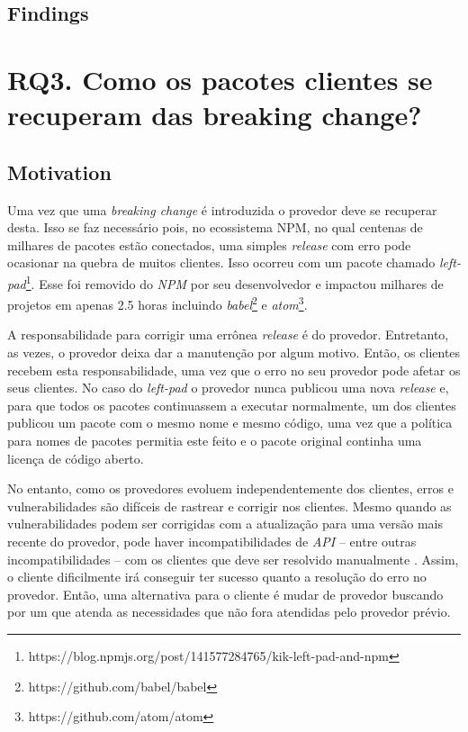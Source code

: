 \subsection{Findings}
\label{fin:rq2}

\section{RQ3. Como os pacotes clientes se recuperam das breaking change?}
\label{sec:rq3}

\subsection{Motivation}
\label{mot:rq3}

Uma vez que uma \textit{breaking change} é introduzida o provedor deve se recuperar desta. Isso se faz necessário pois, no ecossistema \gls{NPM}, no qual centenas de milhares de pacotes estão conectados, uma simples \textit{release} com erro pode ocasionar na quebra de muitos clientes. Isso ocorreu com um pacote chamado \textit{left-pad}\footnote{https://blog.npmjs.org/post/141577284765/kik-left-pad-and-npm}. Esse foi removido do \textit{NPM} por seu desenvolvedor e impactou milhares de projetos em apenas 2.5 horas incluindo \textit{babel}\footnote{https://github.com/babel/babel} e \textit{atom}\footnote{https://github.com/atom/atom}.

A responsabilidade para corrigir uma errônea \textit{release} é do provedor. Entretanto, as vezes, o provedor deixa dar a manutenção por algum motivo. Então, os clientes recebem esta responsabilidade, uma vez que o erro no seu provedor pode afetar os seus clientes. No caso do \textit{left-pad} o provedor nunca publicou uma nova \textit{release} e, para que todos os pacotes continuassem a executar normalmente, um dos clientes publicou um pacote com o mesmo nome e mesmo código, uma vez que a política para nomes de pacotes permitia este feito e o pacote original continha uma licença de código aberto.

No entanto, como os provedores evoluem independentemente dos clientes, erros e vulnerabilidades são difíceis de rastrear e corrigir nos clientes. Mesmo quando as vulnerabilidades podem ser corrigidas com a atualização para uma versão mais recente do provedor, pode haver incompatibilidades de \textit{API} -- entre outras incompatibilidades -- com os clientes que deve ser resolvido manualmente \cite{Foo:2018:ESC:3236024.3275535}. Assim, o cliente dificilmente irá conseguir ter sucesso quanto a resolução do erro no provedor. Então, uma alternativa para o cliente é mudar de provedor buscando por um que atenda as necessidades que não fora atendidas pelo provedor prévio.

